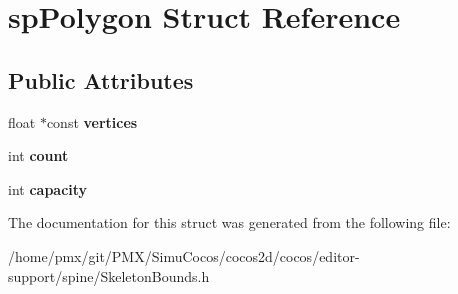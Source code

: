\hypertarget{structspPolygon}{}\section{sp\+Polygon Struct Reference}
\label{structspPolygon}
\subsection*{Public Attributes}
\begin{DoxyCompactItemize}
\item 
\mbox{\label{structspPolygon_a7a6e27ad00d132a385d14437692aeeff}} 
float $\ast$const {\bfseries vertices}
\item 
\mbox{\label{structspPolygon_a855a105f24a85289d75e545b8fac5bae}} 
int {\bfseries count}
\item 
\mbox{\label{structspPolygon_a09c4fbe124fdfcf627da165c51678e96}} 
int {\bfseries capacity}
\end{DoxyCompactItemize}


The documentation for this struct was generated from the following file\+:\begin{DoxyCompactItemize}
\item 
/home/pmx/git/\+P\+M\+X/\+Simu\+Cocos/cocos2d/cocos/editor-\/support/spine/Skeleton\+Bounds.\+h\end{DoxyCompactItemize}
